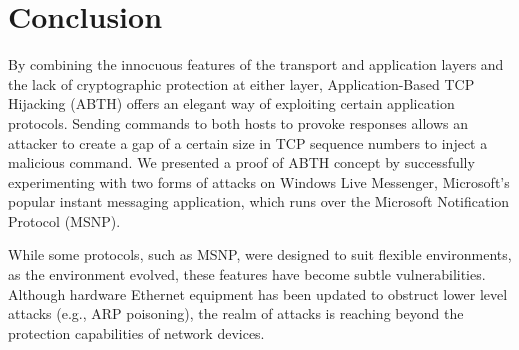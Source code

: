 \documentclass{sig-alternate}
\begin{document}
\section{Conclusion}

By combining the innocuous features of the transport and application layers and the lack of cryptographic protection at either layer, Application-Based TCP Hijacking (ABTH) offers an elegant way of exploiting certain application protocols.
Sending commands to both hosts to provoke responses allows an attacker to create a gap of a certain size in TCP sequence numbers to inject a malicious command.
We presented a proof of ABTH concept by successfully experimenting with two forms of attacks on Windows Live Messenger, Microsoft's popular instant messaging application, which runs over the Microsoft Notification Protocol (MSNP).

While some protocols, such as MSNP, were designed to suit flexible environments, as the environment evolved, these features have become subtle vulnerabilities.
Although hardware Ethernet equipment has been updated to obstruct lower level attacks (e.g., ARP poisoning), the realm of attacks is reaching beyond the protection capabilities of network devices.



\end{document}
